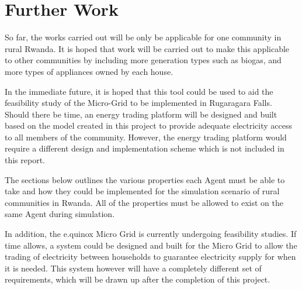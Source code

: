 \chapter{Further Work}
\label{Further Work}

So far, the works carried out will be only be applicable for one community in rural Rwanda. It is hoped that work will be carried out to make this applicable to other communities by including more generation types such as biogas, and more types of appliances owned by each house.

In the immediate future, it is hoped that this tool could be used to aid the feasibility study of the Micro-Grid to be implemented in Rugaragara Falls. Should there be time, an energy trading platform will be designed and built based on the model created in this project to provide adequate electricity access to all members of the community. However, the energy trading platform would require a different design and implementation scheme which is not included in this report.

The sections below outlines the various properties each Agent must be able to take and how they could be implemented for the simulation scenario of rural communities in Rwanda. All of the properties must be allowed to exist on the same Agent during simulation.

In addition, the e.quinox Micro Grid is currently undergoing feasibility studies. If time allows, a system could be designed and built for the Micro Grid to allow the trading of electricity between households to guarantee electricity supply for when it is needed. This system however will have a completely different set of requirements, which will be drawn up after the completion of this project.